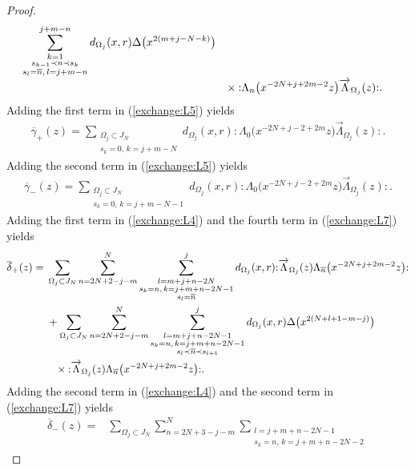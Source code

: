 \documentclass[pdftex]{sigma}
\numberwithin{equation}{section}
\begin{document}
\begin{proof}
\begin{align}
\sum\limits_{\substack{k=1\\s_{k-1}\prec n \prec s_k
\\s_l=\overline{n},\, l=j+m-n}}^{j+m-n}d_{\Omega_j}(x,r)\Delta\big(x^{2(m+j-N-k)}\big)\notag
\\[-.5ex]
&\phantom{+}\times{:}\Lambda_{n}\big(x^{-2N+j+2m-2}z\big)\overrightarrow{\Lambda}_{\Omega_j}(z){:}.
\label{def:bbeta-}
\end{align}
Adding the first term in (\ref{exchange:L5}) yields
\begin{gather}
\overline{\gamma}_+(z)=
\sum\limits_{\substack{\Omega_j \subset J_N\\s_k=0,\, k=j+m-N}}
d_{\Omega_j}(x,r){:}\Lambda_0\big(x^{-2N+j-2+2m}z\big)
\overrightarrow{\Lambda}_{\Omega_j}(z){:}.
\label{def:bgamma+}
\end{gather}
Adding the second term in (\ref{exchange:L5}) yields
\begin{gather}
\overline{\gamma}_-(z)=\sum\limits_{\substack{\Omega_j \subset J_N
\\s_k=0,\, k=j+m-N-1}}d_{\Omega_j}(x,r)
{:}\Lambda_0\big(x^{-2N+j-2+2m}z\big)\overrightarrow{\Lambda}_{\Omega_j}(z){:}.
\label{def:bgamma-}
\end{gather}
Adding the first term in (\ref{exchange:L4}) and
the fourth term in (\ref{exchange:L7}) yields
\begin{align}
\overline{{\delta}}_+(z)={}&\sum_{\Omega_j \subset J_N}\sum_{n=2N+2-j-m}^{N}
\sum\limits_{\substack{l=m+j+n-2N\\
s_k=n, \, k=j+m+n-2N-1\\ s_l=\overline{n}}}^{j}d_{\Omega_j}(x,r)
{:}\overrightarrow{\Lambda}_{\Omega_j}(z)\Lambda_{\overline{n}}\big(x^{-2N+j+2m-2}z\big){:}\notag
\\
&+\sum_{\Omega_j \subset J_N}\sum_{n=2N+2-j-m}^{N}
\sum\limits_{\substack{l=m+j+n-2N-1\\s_k=n,\, k=j+m+n-2N-1
\\s_l\prec \overline{n} \prec s_{l+1}}}^{j}
d_{\Omega_j}(x,r)\Delta\big(x^{2(N+l+1-m-j)}\big)\notag
\\
&\phantom{+}\times{:}\overrightarrow{\Lambda}_{\Omega_j}(z)
\Lambda_{\overline{n}}\big(x^{-2N+j+2m-2}z\big){:}.
\label{def:bdelta+}
\end{align}
Adding the second term in (\ref{exchange:L4}) and
the second term in (\ref{exchange:L7}) yields
\begin{align}
\overline{\delta}_-(z)={}&
\sum_{\Omega_j \subset J_N}\sum_{n=2N+3-j-m}^{N}
\sum\limits_{\substack{l=j+m+n-2N-1\\s_k=n,\, k=j+m+n-2N-2
}}
\end{align}
\end{proof}
\end{document}
